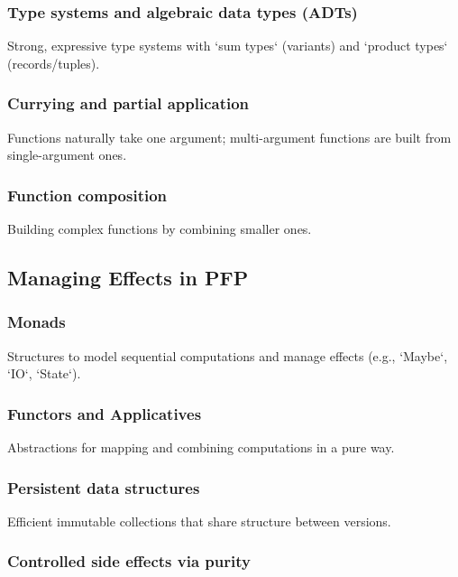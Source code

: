 \documentclass{viser-thesis}
\begin{document}
\subsubsection{Type systems and algebraic data types (ADTs)}

Strong, expressive type systems with `sum types` (variants) and `product types` (records/tuples).

\subsubsection{Currying and partial application}

Functions naturally take one argument; multi-argument functions are built from single-argument ones.

\subsubsection{Function composition}

Building complex functions by combining smaller ones.

\newpage

\subsection{Managing Effects in PFP}

\subsubsection{Monads}

Structures to model sequential computations and manage effects (e.g., `Maybe`, `IO`, `State`).

\subsubsection{Functors and Applicatives}

Abstractions for mapping and combining computations in a pure way.

\subsubsection{Persistent data structures}

Efficient immutable collections that share structure between versions.

\subsubsection{Controlled side effects via purity}
\end{document}
